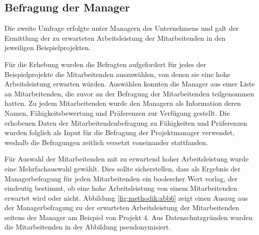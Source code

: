 
\subsection{Befragung der Manager}
Die zweite Umfrage erfolgte unter Managern des Unternehmens und galt der Ermittlung der zu erwarteten Arbeitsleistung der Mitarbeitenden in den jeweiligen Beispielprojekten.

Für die Erhebung wurden die Befragten aufgefordert für jedes der Beispielprojekte die Mitarbeitenden auszuwählen, von denen sie eine hohe Arbeitsleistung erwarten würden.
Auswählen konnten die Manager aus einer Liste an Mitarbeitenden, die zuvor an der Befragung der Mitarbeitenden teilgenommen hatten.
Zu jedem Mitarbeitenden wurde den Managern als Information deren Namen, Fähigkeitsbewertung und Präferenzen zur Verfügung gestellt.
Die erhobenen Daten der Mitarbeitendenbefragung zu Fähigkeiten und Präferenzen wurden folglich als Input für die Befragung der Projektmanager verwendet, weshalb die Befragungen zeitlich versetzt voneinander stattfanden.

Für Auswahl der Mitarbeitenden mit zu erwartend hoher Arbeitsleistung wurde eine Mehrfachauswahl gewählt.
Dies sollte sicherstellen, dass als Ergebnis der Managerbefragung für jeden Mitarbeitenden ein boolescher Wert vorlag, der eindeutig bestimmt, ob eine hohe Arbeitsleistung von einem Mitarbeitenden erwartet wird oder nicht.
Abbildung \ref{fig:methodik:abb6} zeigt einen Auszug aus der Managerbefragung zu der erwarteten Arbeitsleistung der Mitarbeitenden seitens der Manager am Beispiel von Projekt 4.
Aus Datenschutzgründen wurden die Mitarbeitenden in der Abbildung pseudonymisiert.

